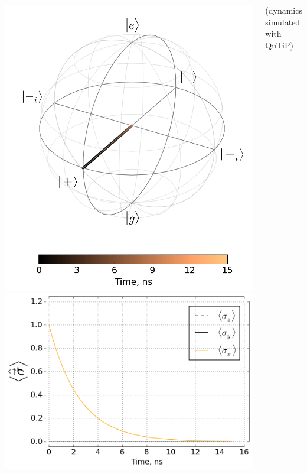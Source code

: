 \documentclass[aspectratio=169, 13pt, t]{beamer}
\begin{document}
{{	\begin{columns}[c]
	\includegraphics[width=\textwidth]{qdeph_bloch_rf}
	\centering
	\includegraphics[width=\textwidth]{qdeph_xyz_rf}
	
	{\footnotesize (dynamics simulated with QuTiP)}

	\end{columns}
}
}
\end{document}
